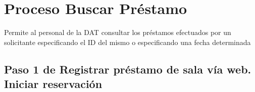 \chapter{Proceso Buscar Préstamo}
	Permite al personal de la DAT consultar los préstamos efectuados
	por un solicitante especificando el ID del mismo o
	especificando una fecha determinada

\section{Paso 1 de Registrar préstamo de sala vía web. 
	Iniciar reservación}
	
